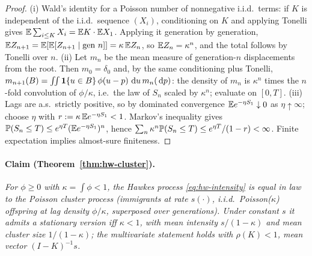 \begin{proof}
(i) Wald's identity for a Poisson number of nonnegative i.i.d.\ terms: if $K$ is independent of the
i.i.d.\ sequence $(X_i)$, conditioning on $K$ and applying Tonelli gives $\mathbb{E} \sum_{i \le K} X_i = \mathbb{E}
K \cdot \mathbb{E} X_1$. Applying it generation by generation, $\mathbb{E} Z_{n+1} = \mathbb{E}[\mathbb{E}[Z_{n+1} \mid \text{gen }
n]] = \kappa\, \mathbb{E} Z_n$, so $\mathbb{E} Z_n = \kappa^n$, and the total follows by Tonelli over $n$. (ii) Let
$m_n$ be the mean measure of generation-$n$ displacements from the root. Then $m_0 = \delta_0$ and,
by the same conditioning plus Tonelli, $m_{n+1}(B) = \int\!\!\int \mathbf{1}\{u \in B\}\, \phi(u - p)\, \,\mathrm{d}
u\, m_n(\,\mathrm{d} p)$: the density of $m_n$ is $\kappa^n$ times the $n$-fold convolution of $\phi/\kappa$,
i.e.\ the law of $S_n$ scaled by $\kappa^n$; evaluate on $[0, T]$. (iii) Lags are a.s.\ strictly
positive, so by dominated convergence $\mathbb{E} e^{-\eta S_1} \downarrow 0$ as $\eta \uparrow \infty$;
choose $\eta$ with $r := \kappa\, \mathbb{E} e^{-\eta S_1} < 1$. Markov's inequality gives $\mathbb{P}(S_n \le T)
\le e^{\eta T} (\mathbb{E} e^{-\eta S_1})^n$, hence $\sum_n \kappa^n \mathbb{P}(S_n \le T) \le e^{\eta T}/(1 - r)
< \infty$. Finite expectation implies almost-sure finiteness.
\end{proof}

\paragraph{Claim (Theorem~\ref{thm:hw-cluster}).}
\emph{For $\phi \ge 0$ with $\kappa = \int \phi < 1$, the Hawkes process \eqref{eq:hw-intensity} is
equal in law to the Poisson cluster process (immigrants at rate $s(\cdot)$, i.i.d.\
Poisson($\kappa$) offspring at lag density $\phi/\kappa$, superposed over generations). Under
constant $s$ it admits a stationary version iff $\kappa < 1$, with mean intensity $s/(1-\kappa)$ and
mean cluster size $1/(1-\kappa)$; the multivariate statement holds with $\rho(K) < 1$, mean vector
$(I-K)^{-1}s$.}


